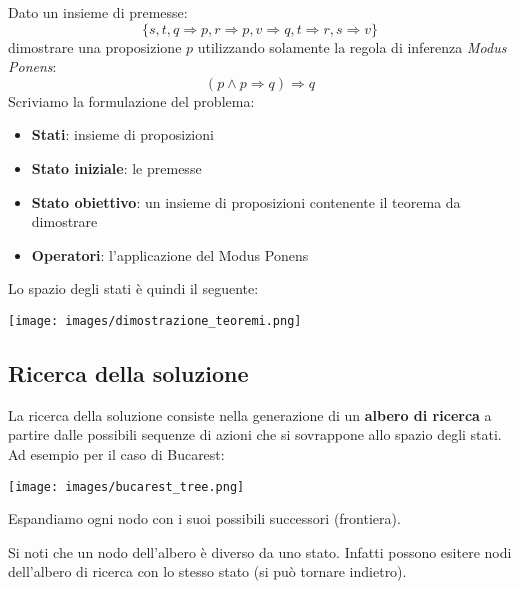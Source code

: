 \begin{example}
	Dato un insieme di premesse:
	\begin{equation}
		\{s, t, q \Rightarrow p, r \Rightarrow p, v \Rightarrow q, t \Rightarrow r, s \Rightarrow v\}
	\end{equation}
	dimostrare una proposizione $p$ utilizzando solamente la regola di inferenza \emph{Modus Ponens}:
	\begin{equation*}
		(p \wedge p\Rightarrow q) \Rightarrow q
	\end{equation*}
	Scriviamo la formulazione del problema:
	\begin{itemize}
		\item \textbf{Stati}: insieme di proposizioni
		\item \textbf{Stato iniziale}: le premesse
		\item \textbf{Stato obiettivo}: un insieme di proposizioni contenente il teorema da dimostrare
		\item \textbf{Operatori}: l'applicazione del Modus Ponens
	\end{itemize}
	Lo spazio degli stati è quindi il seguente:
	\begin{center}
		\texttt{[image: images/dimostrazione\_teoremi.png]}
	\end{center}
\end{example}

\subsection{Ricerca della soluzione}
La ricerca della soluzione consiste nella generazione di un \textbf{albero di ricerca} a partire dalle possibili sequenze di azioni che si sovrappone allo spazio degli stati.\\
Ad esempio per il caso di Bucarest:
\begin{center}
	\texttt{[image: images/bucarest\_tree.png]}
\end{center}
Espandiamo ogni nodo con i suoi possibili successori (frontiera).
\begin{observation}
	Si noti che un nodo dell'albero è diverso da uno stato. Infatti possono esitere nodi dell'albero di ricerca con lo stesso stato (si può tornare indietro).
\end{observation}

